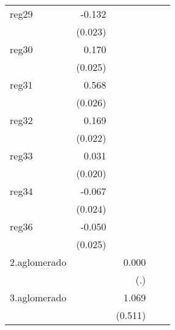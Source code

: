 {\begin{longtable}{l*{4}{D{.}{.}{-1}}}
\addlinespace
reg29       &      -0.132\sym{***}&                     &                     &                     \\
            &     (0.023)         &                     &                     &                     \\
\addlinespace
reg30       &       0.170\sym{***}&                     &                     &                     \\
            &     (0.025)         &                     &                     &                     \\
\addlinespace
reg31       &       0.568\sym{***}&                     &                     &                     \\
            &     (0.026)         &                     &                     &                     \\
\addlinespace
reg32       &       0.169\sym{***}&                     &                     &                     \\
            &     (0.022)         &                     &                     &                     \\
\addlinespace
reg33       &       0.031         &                     &                     &                     \\
            &     (0.020)         &                     &                     &                     \\
\addlinespace
reg34       &      -0.067\sym{**} &                     &                     &                     \\
            &     (0.024)         &                     &                     &                     \\
\addlinespace
reg36       &      -0.050\sym{*}  &                     &                     &                     \\
            &     (0.025)         &                     &                     &                     \\
\addlinespace
2.aglomerado&                     &       0.000         &                     &                     \\
            &                     &         (.)         &                     &                     \\
\addlinespace
3.aglomerado&                     &       1.069\sym{*}  &                     &                     \\
            &                     &     (0.511)         &                     &                     \\

\end{longtable}}
